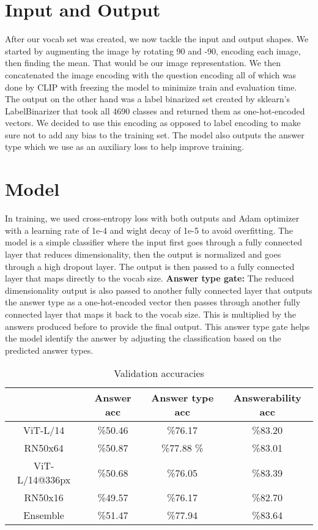 \documentclass[12pt]{IEEEtran}
\begin{document}
\section{Input and Output}
After our vocab set was created, we now tackle the input and output shapes. We started by augmenting the image by rotating 90 and -90, encoding each image, then finding the mean. That would be our image representation. We then concatenated the image encoding with the question encoding all of which was done by CLIP with freezing the model to minimize train and evaluation time. The output on the other hand was a label binarized set created by sklearn’s LabelBinarizer that took all 4690 classes and returned them as one-hot-encoded vectors. We decided to use this encoding as opposed to label encoding to make sure not to add any bias to the training set. The model also outputs the answer type which we use as an auxiliary loss to help improve training.

\section{Model}
In training, we used cross-entropy loss with both outputs and Adam optimizer with a learning rate of 1e-4 and wight decay of 1e-5 to avoid overfitting. The model is a simple classifier where the input first goes through a fully connected layer that reduces dimensionality, then the output is normalized and goes through a high dropout layer. The output is then passed to a fully connected layer that maps directly to the vocab size.  \newline \newline
{\bf Answer type gate:}
The reduced dimensionality output is also passed to another fully connected layer that outputs the answer type as a one-hot-encoded vector then passes through another fully connected layer that maps it back to the vocab size. This is multiplied by the answers produced before to provide the final output. This answer type gate helps the model identify the answer by adjusting the classification based on the predicted answer types.


\begin{table}[h]
\caption{Validation accuracies} \label{tab:title}
\def\arraystretch{1.5}
\begin{tabular}{|c|c|c|c|}
\hline
 & Answer acc & Answer type acc & Answerability acc\\ \hline
ViT-L/14 & \%50.46  & \%76.17   & \%83.20  \\ \hline
RN50x64 & \%50.87 & \%77.88 \%  & \%83.01 \\ \hline
ViT-L/14@336px & \%50.68 & \%76.05  & \%83.39 \\ \hline
RN50x16 & \%49.57 & \%76.17  & \%82.70 \\ \hline
Ensemble & \%51.47 & \%77.94  & \%83.64 \\ \hline
\end{tabular}
\end{table}
\end{document}

